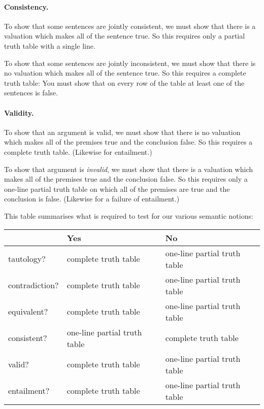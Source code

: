 \paragraph{Consistency.}
To show that some sentences are jointly consistent, we must show that there is a valuation which makes all of the sentence true. So this requires only a partial truth table with a single line. 

To show that some sentences are jointly inconsistent, we must show that there is no valuation which makes all of the sentence true. So this requires a complete truth table: You must show that on every row of the table at least one of the sentences is false.

\paragraph{Validity.}
To show that an argument is valid, we must show that there is no valuation which makes all of the premises true and the conclusion false. So this  requires a complete truth table.  (Likewise for entailment.)

To show that argument is \emph{invalid}, we must show that there is a valuation which makes all of the premises true and the conclusion false. So this requires only a one-line partial truth table on which all of the premises are true and the conclusion is false. (Likewise for a failure of entailment.)



This table summarises what is required to test for our various semantic notions:
\begin{center}
\begin{tabular}{l l l} \toprule 
 & \textbf{Yes} & \textbf{No}\\
 \midrule
tautology? & complete truth table & one-line partial truth table\\
contradiction? &  complete truth table  & one-line partial truth table\\
equivalent? & complete truth table & one-line partial truth table\\
consistent? & one-line partial truth table & complete truth table\\
valid? & complete truth table & one-line partial truth table\\
entailment? & complete truth table & one-line partial truth table\\
\bottomrule \end{tabular}
\end{center}
\label{table.CompleteVsPartial}

